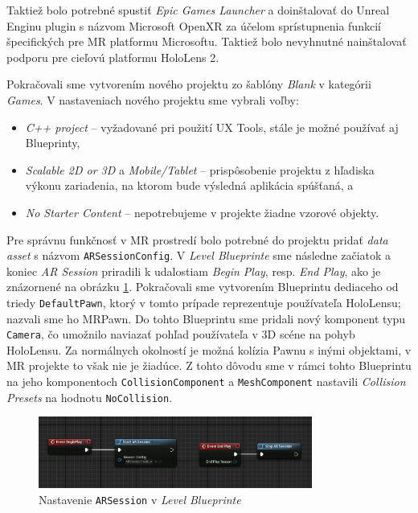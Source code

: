 Taktiež bolo potrebné spustiť \emph{Epic Games Launcher} a doinštalovať do Unreal Enginu plugin s názvom Microsoft OpenXR za účelom sprístupnenia funkcií špecifických pre MR platformu Microsoftu. Taktiež bolo nevyhnutné
nainštalovať podporu pre cieľovú platformu HoloLens 2. 

Pokračovali sme vytvorením nového projektu zo šablóny \emph{Blank} v kategórii \emph{Games}. V nastaveniach nového projektu sme vybrali voľby:
\begin{itemize}
  \item \emph{C++ project} {--} vyžadované pri použití UX Tools, stále je možné používať aj Blueprinty,
  \item \emph{Scalable 2D or 3D} a \emph{Mobile/Tablet} {--} prispôsobenie projektu z hľadiska výkonu zariadenia, na ktorom bude výsledná aplikácia spúšťaná, a
  \item \emph{No Starter Content} {--} nepotrebujeme v projekte žiadne vzorové objekty.
\end{itemize}

Pre správnu funkčnosť v MR prostredí bolo potrebné do projektu pridať \emph{data asset} s názvom \texttt{ARSessionConfig}. V \emph{Level Blueprinte} sme následne začiatok a koniec \emph{AR Session}
priradili k udalostiam \emph{Begin Play}, resp. \emph{End Play}, ako je znázornené na obrázku \ref{arsession}.
Pokračovali sme vytvorením Blueprintu dediaceho od triedy \texttt{DefaultPawn}, ktorý v tomto prípade reprezentuje používateľa HoloLensu; nazvali sme ho MRPawn.
Do tohto Blueprintu sme pridali nový komponent typu
\texttt{Camera}, čo umožnilo naviazať pohľad používateľa v 3D scéne na pohyb HoloLensu. Za normálnych okolností je možná kolízia Pawnu s inými objektami, v MR projekte to však nie je žiadúce.
Z tohto dôvodu sme v rámci tohto Blueprintu na jeho komponentoch \texttt{CollisionComponent} a \texttt{MeshComponent} nastavili \emph{Collision Presets} na hodnotu \texttt{NoCollision}. 

\begin{figure}[!htbp]
  \centering
  \includegraphics[width=9cm]{img/arsession.png}
  \caption{Nastavenie \texttt{ARSession} v \emph{Level Blueprinte}}
  \label{arsession}
\end{figure}

